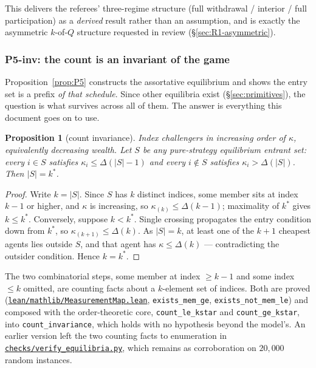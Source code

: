 \documentclass[11pt]{article}
\newtheorem{proposition}{Proposition}
\newcommand{\file}[1]{\href{run:#1}{\texttt{#1}}}
\begin{document}
This delivers the referees' three-regime structure (full withdrawal /
interior / full participation) as a \emph{derived} result rather than
an assumption, and is exactly the asymmetric $k$-of-$Q$ structure
requested in review (\S\ref{sec:R1-asymmetric}).

\subsubsection{P5-inv: the count is an invariant of the game}
\label{prop:count-inv}

Proposition~\ref{prop:P5} constructs the assortative equilibrium and shows the
entry set is a prefix \emph{of that schedule}. Since other equilibria exist
(\S\ref{sec:primitives}), the question is what survives across all of them.
The answer is everything this document goes on to use.

\begin{proposition}[count invariance]
\label{prop:countinv}
Index challengers in increasing order of $\kappa$, equivalently decreasing
wealth. Let $S$ be any pure-strategy equilibrium entrant set: every $i\in S$
satisfies $\kappa_i\le\Delta(|S|-1)$ and every $i\notin S$ satisfies
$\kappa_i>\Delta(|S|)$. Then $|S| = k^*$.
\end{proposition}
\begin{proof}
Write $k=|S|$. Since $S$ has $k$ distinct indices, some member sits at index
$k-1$ or higher, and $\kappa$ is increasing, so
$\kappa_{(k)}\le\Delta(k-1)$; maximality of $k^*$ gives $k\le k^*$.
Conversely, suppose $k<k^*$. Single crossing propagates the entry condition
down from $k^*$, so $\kappa_{(k+1)}\le\Delta(k)$. As $|S|=k$, at least one of
the $k+1$ cheapest agents lies outside $S$, and that agent has
$\kappa\le\Delta(k)$ --- contradicting the outsider condition. Hence
$k = k^*$.
\end{proof}

The two combinatorial steps, some member at index $\ge k-1$ and some index
$\le k$ omitted, are counting facts about a $k$-element set of indices. Both
are proved (\file{lean/mathlib/MeasurementMap.lean}, \texttt{exists\_mem\_ge},
\texttt{exists\_not\_mem\_le}) and composed with the order-theoretic core,
\texttt{count\_le\_kstar} and \texttt{count\_ge\_kstar}, into
\texttt{count\_invariance}, which holds with no hypothesis beyond the model's.
An earlier version left the two counting facts to enumeration in
\file{checks/verify\_equilibria.py}, which remains as corroboration on
$20{,}000$ random instances.
\end{document}
